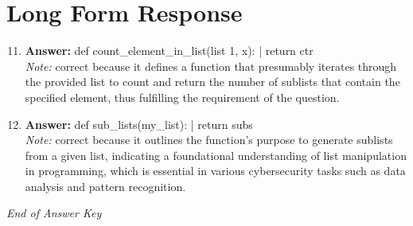 \documentclass[12pt]{article}
\begin{document}
\section*{Long Form Response}
\begin{enumerate}[label=\arabic*.]
\setcounter{enumi}{10}
\item \textbf{Answer:} def count\_element\_in\_list(list 1, x): | return ctr
\\ \textit{Note:} correct because it defines a function that presumably iterates through the provided list to count and return the number of sublists that contain the specified element, thus fulfilling the requirement of the question.
\item \textbf{Answer:} def sub\_lists(my\_list): | return subs
\\ \textit{Note:} correct because it outlines the function's purpose to generate sublists from a given list, indicating a foundational understanding of list manipulation in programming, which is essential in various cybersecurity tasks such as data analysis and pattern recognition.
\end{enumerate}

\vfill
\noindent\textit{End of Answer Key}
\end{document}
